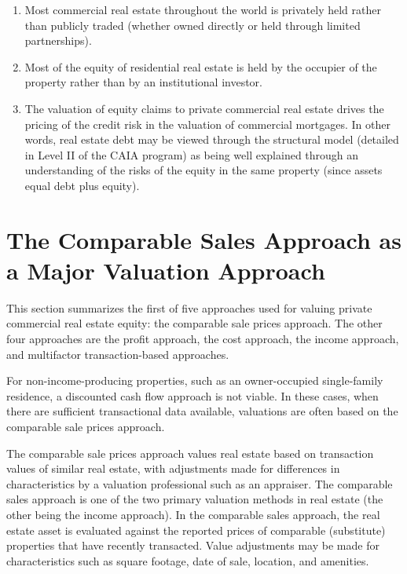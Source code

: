 \documentclass[11pt]{article}
\begin{document}
\begin{enumerate}
  \item Most commercial real estate throughout the world is privately held rather than publicly traded (whether owned directly or held through limited partnerships).

  \item Most of the equity of residential real estate is held by the occupier of the property rather than by an institutional investor.

  \item The valuation of equity claims to private commercial real estate drives the pricing of the credit risk in the valuation of commercial mortgages. In other words, real estate debt may be viewed through the structural model (detailed in Level II of the CAIA program) as being well explained through an understanding of the risks of the equity in the same property (since assets equal debt plus equity).

\end{enumerate}

\section*{The Comparable Sales Approach as a Major Valuation Approach}
This section summarizes the first of five approaches used for valuing private commercial real estate equity: the comparable sale prices approach. The other four approaches are the profit approach, the cost approach, the income approach, and multifactor transaction-based approaches.

For non-income-producing properties, such as an owner-occupied single-family residence, a discounted cash flow approach is not viable. In these cases, when there are sufficient transactional data available, valuations are often based on the comparable sale prices approach.

The comparable sale prices approach values real estate based on transaction values of similar real estate, with adjustments made for differences in characteristics by a valuation professional such as an appraiser. The comparable sales approach is one of the two primary valuation methods in real estate (the other being the income approach). In the comparable sales approach, the real estate asset is evaluated against the reported prices of comparable (substitute) properties that have recently transacted. Value adjustments may be made for characteristics such as square footage, date of sale, location, and amenities.
\end{document}

